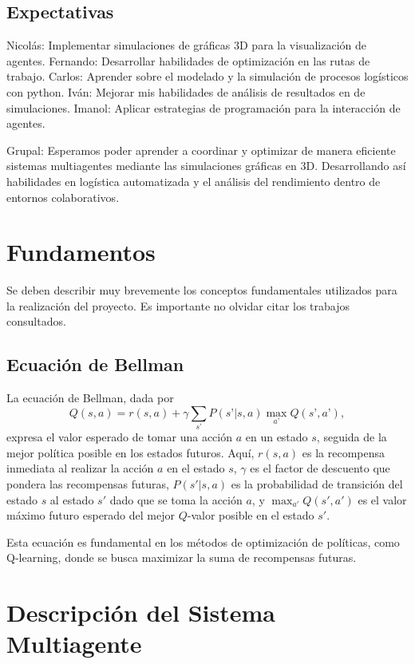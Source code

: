 \documentclass[sjournal]{IEEEtran}
\begin{document}
\subsection{Expectativas}
Nicolás:  Implementar simulaciones de gráficas 3D para la visualización de agentes.
Fernando: Desarrollar habilidades de optimización en las rutas de trabajo.
Carlos: Aprender sobre el modelado y la simulación de procesos logísticos con python.
Iván: Mejorar mis habilidades  de análisis de resultados en de simulaciones.
Imanol: Aplicar estrategias de programación para la interacción de agentes.

Grupal: Esperamos poder aprender a coordinar y optimizar de manera eficiente sistemas multiagentes mediante las simulaciones gráficas en 3D. Desarrollando así habilidades en logística automatizada y el análisis del rendimiento dentro de entornos colaborativos.


\section{Fundamentos}

\noindent
Se deben describir muy brevemente los conceptos fundamentales utilizados para la realización del proyecto. Es importante no olvidar citar los trabajos consultados.

\subsection{Ecuación de Bellman}

La ecuación de Bellman, dada por
\begin{equation}\label{Eq:Bellman}
	Q(s, a) = r(s, a) + \gamma \sum_{s’} P(s’ | s, a) \max_{a’} Q(s’, a’),
\end{equation}
expresa el valor esperado de tomar una acción \(a\) en un estado \(s\), seguida de la mejor política posible en los estados futuros. Aquí, \(r(s, a)\) es la recompensa inmediata al realizar la acción \(a\) en el estado \(s\), \(\gamma\) es el factor de descuento que pondera las recompensas futuras, \(P(s' | s, a)\) es la probabilidad de transición del estado \(s\) al estado \(s'\) dado que se toma la acción \(a\), y \(\max_{a'} Q(s', a')\) es el valor máximo futuro esperado del mejor \(Q\)-valor posible en el estado \(s'\).

Esta ecuación es fundamental en los métodos de optimización de políticas, como Q-learning, donde se busca maximizar la suma de recompensas futuras.


\section{Descripción del Sistema Multiagente}
\end{document}
